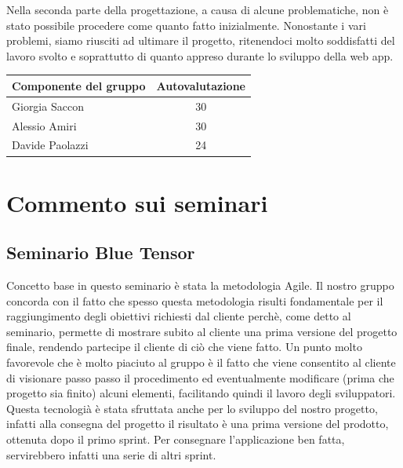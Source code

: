 \documentclass[a4paper,12pt]{article}
\begin{document}
Nella seconda parte della progettazione, a causa di alcune problematiche, non è stato possibile procedere come quanto fatto inizialmente.
Nonostante i vari problemi, siamo riusciti ad ultimare il progetto, ritenendoci molto soddisfatti del lavoro svolto e soprattutto di quanto appreso durante lo sviluppo della web app.
\begin{center}
\begin{tabular}{|l|c|}
\hline
\textbf{Componente del gruppo}  &\textbf{Autovalutazione}      \\ \hline
Giorgia Saccon          & 30  \\ \hline 
Alessio Amiri           & 30  \\ \hline 
Davide Paolazzi         & 24   \\ \hline 
\end{tabular}
\end{center}
\newpage
\section{Commento sui seminari}

\subsection{Seminario Blue Tensor}
Concetto base in questo seminario è stata la metodologia Agile. \newline
Il nostro gruppo concorda con il fatto che spesso questa metodologia risulti fondamentale per il raggiungimento degli obiettivi richiesti dal cliente perchè, come detto al seminario, permette di mostrare subito al cliente una prima versione del progetto finale, rendendo partecipe il cliente di ciò che viene fatto. \newline
Un punto molto favorevole che è molto piaciuto al gruppo è il fatto che viene consentito al cliente di visionare passo passo il procedimento ed eventualmente modificare (prima che progetto sia finito) alcuni elementi, facilitando quindi il lavoro degli sviluppatori. \newline
Questa tecnologià è stata sfruttata anche per lo sviluppo del nostro progetto, infatti alla consegna del progetto il risultato è una prima versione del prodotto, ottenuta dopo il primo sprint. Per consegnare l'applicazione ben fatta, servirebbero infatti una serie di altri sprint.
\end{document}
